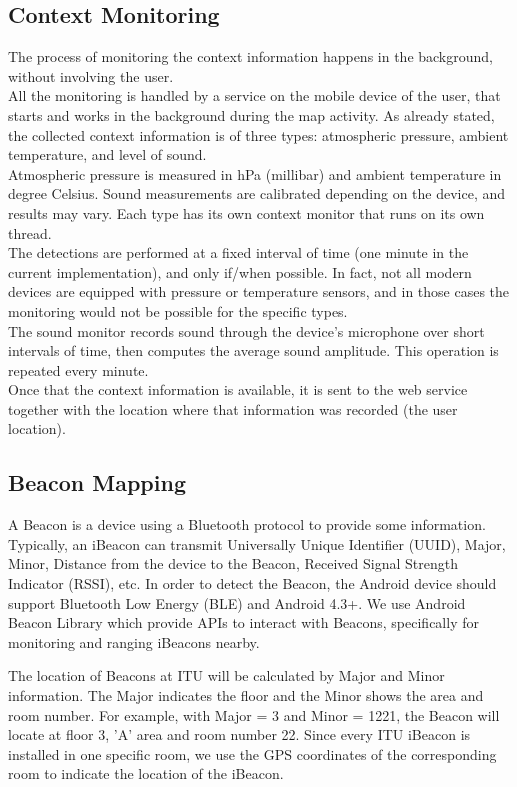 \documentclass{sigchi}
\begin{document}
\subsection{Context Monitoring}
The process of monitoring the context information happens in the background, without involving the user. \\
All the monitoring is handled by a service on the mobile device of the user, that starts and works in the background during the map activity.
As already stated, the collected context information is of three types: atmospheric pressure, ambient temperature, and level of sound. \\
Atmospheric pressure is measured in hPa (millibar) and ambient temperature in degree Celsius.
Sound measurements are calibrated depending on the device, and results may vary.
Each type has its own context monitor that runs on its own thread. \\
The detections are performed at a fixed interval of time (one minute in the current implementation), and only if/when possible. In fact, not all modern devices are equipped with pressure or temperature sensors, and in those cases the monitoring would not be possible for the specific types.\\
The sound monitor records sound through the device's microphone over short intervals of time, then computes the average sound amplitude. This operation is repeated every minute. \\
Once that the context information is available, it is sent to the web service together with the location where that information was recorded (the user location).

\subsection{Beacon Mapping}
A Beacon is a device using a Bluetooth protocol to provide some information.
Typically, an iBeacon can transmit Universally Unique Identifier (UUID), Major, Minor, Distance from the device to the Beacon, Received Signal Strength Indicator (RSSI), etc.
In order to detect the Beacon, the Android device should support Bluetooth Low Energy (BLE) and Android 4.3+.
We use Android Beacon Library which provide APIs to interact with Beacons, specifically for monitoring and ranging iBeacons nearby.

The location of Beacons at ITU will be calculated by Major and Minor information.
The Major indicates the floor and the Minor shows the area and room number.
For example, with Major = 3 and Minor = 1221, the Beacon will locate at floor 3, 'A' area and room number 22.
Since every ITU iBeacon is installed in one specific room, we use the GPS coordinates of the corresponding room to indicate the location of the iBeacon.
\end{document}
